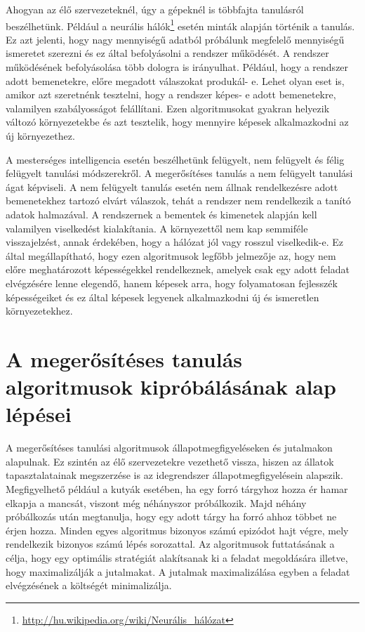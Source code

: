 	 Ahogyan az élő szervezeteknél, úgy a gépeknél is többfajta tanulásról beszélhetünk. Például a neurális hálók\footnote{\href {http://hu.wikipedia.org/wiki/Neurális\_hálózat}{http://hu.wikipedia.org/wiki/Neurális\_hálózat}} esetén minták alapján történik a tanulás. Ez azt jelenti, hogy nagy mennyiségű adatból próbálunk megfelelő mennyiségű ismeretet szerezni és ez által befolyásolni a rendszer működését. A rendszer működésének befolyásolása több dologra is irányulhat. Például, hogy a rendszer adott bemenetekre, előre megadott válaszokat produkál- e. Lehet olyan eset is, amikor azt szeretnénk tesztelni, hogy a rendszer képes- e adott bemenetekre, valamilyen szabályosságot felállítani. Ezen algoritmusokat gyakran helyezik változó környezetekbe és azt tesztelik, hogy mennyire képesek alkalmazkodni az új környezethez. 	
	
	 A mesterséges intelligencia esetén beszélhetünk felügyelt, nem felügyelt és félig felügyelt tanulási módszerekről. A megerősítéses tanulás a nem felügyelt tanulási ágat képviseli. A nem felügyelt tanulás esetén nem állnak rendelkezésre adott bemenetekhez tartozó elvárt válaszok, tehát a rendszer nem rendelkezik a tanító adatok halmazával. A rendszernek a bementek és kimenetek alapján kell valamilyen viselkedést kialakítania. A környezettől nem kap semmiféle visszajelzést, annak érdekében, hogy a hálózat jól vagy rosszul viselkedik-e. Ez által megállapítható, hogy ezen algoritmusok legfőbb jelmezője az, hogy nem előre meghatározott képességekkel rendelkeznek, amelyek csak egy adott feladat elvégzésére lenne elegendő, hanem képesek arra, hogy folyamatosan fejlesszék képességeiket és ez által képesek legyenek alkalmazkodni új és ismeretlen környezetekhez.

\section{A megerősítéses tanulás algoritmusok kipróbálásának alap lépései}\label{sec:MEGEROSITESESALOGRITMUSOK}

A megerősítéses tanulási\cite{reinfLearning} algoritmusok állapotmegfigyeléseken és jutalmakon alapulnak. Ez szintén az élő szervezetekre vezethető vissza, hiszen az állatok tapasztalatainak megszerzése is az idegrendszer állapotmegfigyelésein alapszik. Megfigyelhető például a kutyák esetében, ha egy forró tárgyhoz hozza ér hamar elkapja a mancsát, viszont még néhányszor próbálkozik. Majd néhány próbálkozás után megtanulja, hogy egy adott tárgy ha forró ahhoz többet ne érjen hozza. 
Minden egyes algoritmus bizonyos számú epizódot hajt végre, mely rendelkezik bizonyos számú lépés sorozattal. Az algoritmusok futtatásának a célja, hogy egy optimális stratégiát alakítsanak ki a feladat megoldására illetve, hogy maximalizálják a jutalmakat. A jutalmak maximalizálása egyben a feladat elvégzésének a költségét minimalizálja.\cite{dynamicProg}


